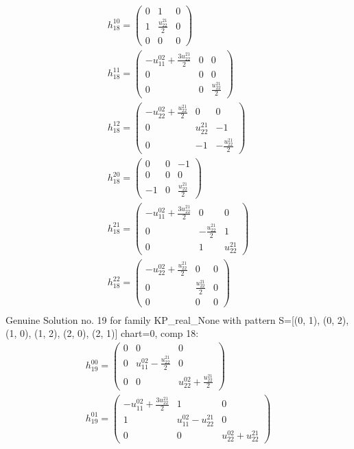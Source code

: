 \documentclass[a4paper, 11pt, twoside, onecolumn]{article}
\begin{document}
\begin{landscape}
\begin{gather*}
	 h_{18}^{10}=\begin{pmatrix}0 & 1 & 0\\1 & \frac{u^{21}_{22}}{2} & 0\\0 & 0 & 0\end{pmatrix}\\ 
	 h_{18}^{11}=\begin{pmatrix}- u^{02}_{11} + \frac{3 u^{21}_{22}}{2} & 0 & 0\\0 & 0 & 0\\0 & 0 & \frac{u^{21}_{22}}{2}\end{pmatrix}\\ 
	 h_{18}^{12}=\begin{pmatrix}- u^{02}_{22} + \frac{u^{21}_{22}}{2} & 0 & 0\\0 & u^{21}_{22} & -1\\0 & -1 & - \frac{u^{21}_{22}}{2}\end{pmatrix}\\ 
	 h_{18}^{20}=\begin{pmatrix}0 & 0 & -1\\0 & 0 & 0\\-1 & 0 & \frac{u^{21}_{22}}{2}\end{pmatrix}\\ 
	 h_{18}^{21}=\begin{pmatrix}- u^{02}_{11} + \frac{3 u^{21}_{22}}{2} & 0 & 0\\0 & - \frac{u^{21}_{22}}{2} & 1\\0 & 1 & u^{21}_{22}\end{pmatrix}\\ 
	 h_{18}^{22}=\begin{pmatrix}- u^{02}_{22} + \frac{u^{21}_{22}}{2} & 0 & 0\\0 & \frac{u^{21}_{22}}{2} & 0\\0 & 0 & 0\end{pmatrix}\\ 
\end{gather*} 
Genuine Solution no. 19 for family KP_real_None with pattern S=[(0, 1), (0, 2), (1, 0), (1, 2), (2, 0), (2, 1)] chart=0, comp 18: 
\begin{gather*} 
	 h_{19}^{00}=\begin{pmatrix}0 & 0 & 0\\0 & u^{02}_{11} - \frac{u^{21}_{22}}{2} & 0\\0 & 0 & u^{02}_{22} + \frac{u^{21}_{22}}{2}\end{pmatrix}\\ 
	 h_{19}^{01}=\begin{pmatrix}- u^{02}_{11} + \frac{3 u^{21}_{22}}{2} & 1 & 0\\1 & u^{02}_{11} - u^{21}_{22} & 0\\0 & 0 & u^{02}_{22} + u^{21}_{22}\end{pmatrix}\\ 

\end{gather*}
\end{landscape}
\end{document}
